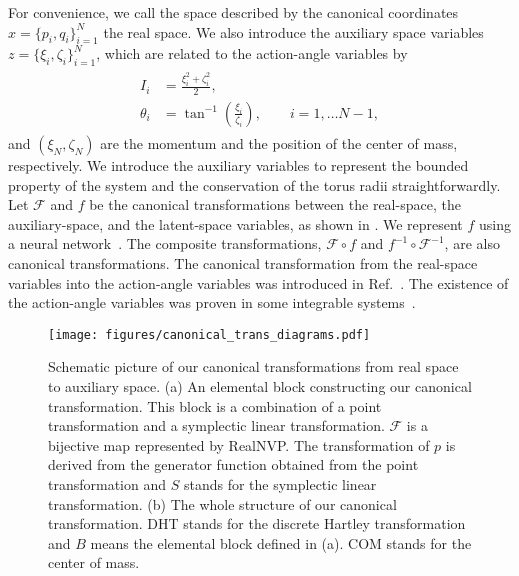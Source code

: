 For convenience, we call the space described by the canonical coordinates $x = \{p_i,q_i\}_{i=1}^{N}$ the real space.
We also introduce the auxiliary space variables $z = \{\xi_i,\zeta_i\}_{i=1}^{N}$, which are related to the action-angle variables by
\begin{align}
  \begin{split}
    I_i & = \frac{\xi_i^2 + \zeta_i^2}{2}, \\
    \theta_i & = \tan^{-1}\left(\frac{\xi_i}{\zeta_i}\right), \qquad i = 1, \ldots N-1,
  \end{split} \label{eq:latent_space_representation_of_action_angle_variables}
\end{align}
and $(\xi_N,\zeta_N)$ are the momentum and the position of the center of mass, respectively.
We introduce the auxiliary variables to represent the bounded property of the system and the conservation of the torus radii straightforwardly.
Let $\mathscr{F}$ and $f$ be the canonical transformations between the real-space, the auxiliary-space, and the latent-space variables, as shown in . We represent $f$ using a neural network~\cite{our_supplemental_material}.
The composite transformations, $\mathscr{F} \circ f$ and $f^{-1}\circ \mathscr{F}^{-1}$, are also canonical transformations.
The canonical transformation from the real-space variables into the action-angle variables was introduced in Ref.~.
The existence of the action-angle variables was proven in some integrable systems~\cite{Nguyen2005,Ito1989,Kappeler1998,Kappelerf-Henricit2008,Henrici2015}.
\begin{figure}[tp]
  \centering
  \texttt{[image: figures/canonical\_trans\_diagrams.pdf]}
  \caption{
    Schematic picture of our canonical transformations from real space to auxiliary space.
    (a) An elemental block constructing our canonical transformation.
    This block is a combination of a point transformation and a symplectic linear transformation.
    $\mathcal{F}$ is a bijective map represented by RealNVP.
    The transformation of $p$ is derived from the generator function obtained from the point transformation and
    $S$ stands for the symplectic linear transformation.
    (b) The whole structure of our canonical transformation.
    DHT stands for the discrete Hartley transformation and
    $B$ means the elemental block defined in (a).
    COM stands for the center of mass.
    }
  \label{fig:canonical_trans_diagrams}
\end{figure}


